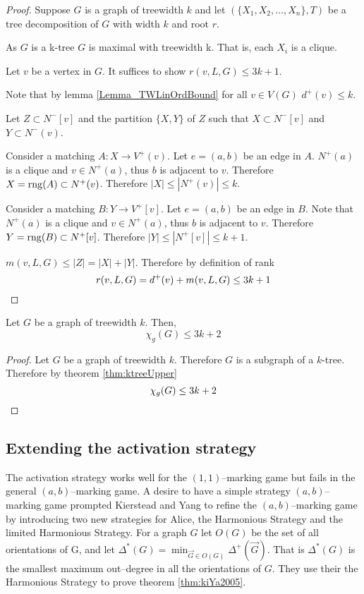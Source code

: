 \begin{proof}
    Suppose $G$ is a graph of treewidth $k$ and let $(\{X_1,X_2,\dots,X_n\},T)$ be a tree decomposition of $G$ with width $k$ and root $r$.
    
    As $G$ is a k-tree $G$ is maximal with treewidth k. That is, each $X_i$ is a clique.
    
    Let $v$ be a vertex in $G$. It suffices to show $r(v,L,G) \leq 3k + 1$.
    
    
    Note that by lemma \ref{Lemma_TWLinOrdBound} for all $v \in V(G)$ $d^+(v) \leq k$.
    
    Let $Z \subset N^-[v]$ and the partition $\{X,Y\}$ of $Z$ such that $X\subset N^-[v]$ and  $Y\subset N^-(v)$.
           
    Consider a matching $A\colon X \to V^+(v)$. Let $e=(a,b)$ be an edge in $A$.
    $N^+(a)$ is a clique and $v\in N^+(a)$, thus $b$ is adjacent to $v$. Therefore $X =\operatorname{rng}(A)\subset N^+(v)$. Therefore $|X| \leq |N^+(v)| \leq k$. 
    
    Consider a matching $B\colon Y \to V^+[v]$. Let $e=(a,b)$ be an edge in $B$.
    Note that $N^+(a)$ is a clique and $v\in N^+(a)$, thus $b$ is adjacent to $v$. Therefore $Y =\operatorname{rng}(B)\subset N^+[v]$. Therefore $|Y| \leq |N^+[v]| \leq k+1$. 
        
    $m(v,L,G) \leq |Z| = |X|+|Y|$. Therefore by definition of rank \[r(v,L,G) = d^+(v) + m(v,L,G) \leq 3k +1 \qedhere\]        
\end{proof}

\begin{corollary}
    Let $G$ be a graph of treewidth $k$. Then, 
    \[\chi_g(G) \leq 3k + 2\]
\end{corollary}

\begin{proof}
    Let $G$ be a graph of treewidth $k$.
    Therefore $G$ is a subgraph of a $k$-tree. Therefore by theorem \ref{thm:ktreeUpper} \[\chi_g(G) \leq 3k + 2 \qedhere\] 
\end{proof}

\subsection{Extending the activation strategy}

The activation strategy works well for the $(1,1)$--marking game but fails in the general $(a,b)$--marking game. A desire to have a simple strategy $(a,b)$--marking game prompted Kierstead and Yang to refine the $(a,b)$--marking game by introducing two new strategies for Alice, the Harmonious Strategy and the limited Harmonious Strategy.  For a graph $G$ let $O(G)$ be the set of all orientations of G, and let $\Delta^*(G)=\min_{\vec{G}\in O(G)}\Delta^+(\vec{G})$. That is $\Delta^*(G)$ is the smallest maximum out--degree in all the orientations of $G$. They use their the Harmonious Strategy to prove theorem \ref{thm:kiYa2005}.

